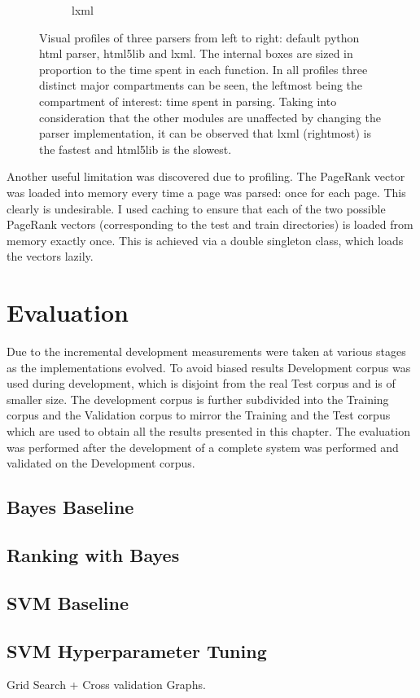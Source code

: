 \documentclass[11pt,twoside,notitlepage]{report}
\begin{document}
\begin{figure}[h]
\begin{subfigure}[b]{.3\textwidth}
  \caption{lxml}
  \label{lxml}
\end{subfigure}
\caption{Visual profiles of three parsers from left to right: default python
html parser, html5lib and lxml. The internal boxes are sized in proportion to
the time spent in each function. In all profiles three distinct major
compartments can be seen, the leftmost being the compartment of interest: 
time spent in parsing. Taking into consideration that the other modules are unaffected by changing the parser
implementation, it can be observed that lxml (rightmost) is the fastest and
html5lib is the slowest.\label{parsers}}
\end{figure}

Another useful limitation was discovered due to profiling. The PageRank vector
was loaded into memory every time a page was parsed: once for each page. This
clearly is undesirable. I used caching to ensure that each of the two possible
PageRank vectors (corresponding to the test and train directories) is loaded
from memory exactly once. This is achieved via a double singleton class, which
loads the vectors lazily.
\cleardoublepage
\chapter{Evaluation}
Due to the incremental development measurements were taken at various stages as
the implementations evolved. To avoid biased results Development corpus was
used during development, which is disjoint from the real Test corpus and is of
smaller size. The development corpus is further subdivided into the Training
corpus and the Validation corpus to mirror the Training and the Test corpus
which are used to obtain all the results presented in this chapter.
The evaluation was performed after the development of a complete system was
performed and validated on the Development corpus.
\section{Bayes Baseline}

\section{Ranking with Bayes}
\section{SVM Baseline}
\section{SVM Hyperparameter Tuning}
Grid Search + Cross validation
Graphs.
\end{document}
